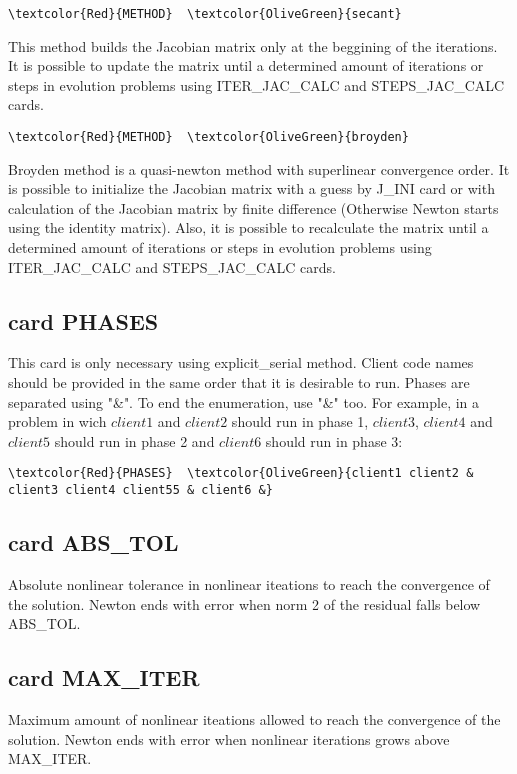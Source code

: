 \begin{Verbatim}[frame=single,commandchars=\\\{\}]
\textcolor{Red}{METHOD}  \textcolor{OliveGreen}{secant} 
\end{Verbatim}
This method builds the Jacobian matrix only at the beggining of the iterations. It is possible to update the matrix until a determined amount of iterations or steps in evolution problems using ITER_JAC_CALC and STEPS_JAC_CALC cards.

\begin{Verbatim}[frame=single,commandchars=\\\{\}]
\textcolor{Red}{METHOD}  \textcolor{OliveGreen}{broyden}
\end{Verbatim}
Broyden method is a quasi-newton method with superlinear convergence order. It is possible to initialize the Jacobian matrix with a guess by J_INI card or with calculation of the Jacobian matrix by finite difference (Otherwise Newton starts using the identity matrix). Also, it is possible to recalculate the matrix until a determined amount of iterations or steps in evolution problems using ITER_JAC_CALC and STEPS_JAC_CALC cards.

\subsection{card PHASES}
This card is only necessary using explicit_serial method. Client code names should be provided in the same order that it is desirable to run. Phases are separated using "&". To end the enumeration, use "&" too. For example, in a problem in wich $client1$ and $client2$ should run in phase 1, $client3$, $client4$ and $client5$ should run in phase 2 and $client6$ should run in phase 3:
\begin{Verbatim}[frame=single,commandchars=\\\{\}]
\textcolor{Red}{PHASES}  \textcolor{OliveGreen}{client1 client2 & client3 client4 client55 & client6 &}
\end{Verbatim}

\subsection{card ABS_TOL}
Absolute nonlinear tolerance in nonlinear iteations to reach the convergence of the solution. Newton ends with error when norm 2 of the residual falls below ABS_TOL.

\subsection{card MAX_ITER}
Maximum amount of nonlinear iteations allowed to reach the convergence of the solution. Newton ends with error when nonlinear iterations grows above MAX_ITER.








